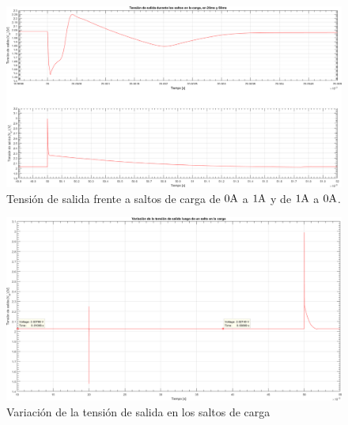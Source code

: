 \vfill

\clearpage

\begin{figure}[H] %
\begin{center}
\includegraphics[width=1.2 \textwidth, angle=90]{./img/preguntas/p16b.png}
\caption{\label{fig:fig_p16_output_in_load_jump}\footnotesize{Tensión de salida frente a saltos de carga de $0 \si[per-mode=symbol]{\ampere}$ a $1 \si[per-mode=symbol]{\ampere}$ y de $1 \si[per-mode=symbol]{\ampere}$ a $0 \si[per-mode=symbol]{\ampere}$.}}
\end{center}
\end{figure}


\clearpage

\begin{figure}[H] %
\begin{center}
\includegraphics[width=1.2 \textwidth, angle=90]{./img/preguntas/p16c.png}
\caption{\label{fig:fig_p16_output_variation_in_load_jump}\footnotesize{Variación de la tensión de salida en los saltos de carga}}
\end{center}
\end{figure}




\clearpage
